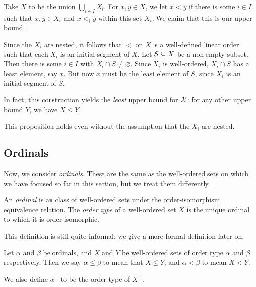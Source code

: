 \documentclass{article}
\begin{document}
\begin{prf}
    Take $X$ to be the union $\bigcup_{i \in I} X_i$. For $x, y \in X$, we let $x < y$ if there is some $i \in I$ such that $x, y \in X_i$ and $x <_i y$ within this set $X_i$. We claim that this is our upper bound.
    
    Since the $X_i$ are nested, it follows that $<$ on $X$ is a well-defined linear order such that each $X_i$ is an initial segment of $X$. Let $S \subseteq X$ be a non-empty subset. Then there is some $i \in I$ with $X_i \cap S \neq \varnothing$. Since $X_i$ is well-ordered, $X_i \cap S$ has a least element, say $x$. But now $x$ must be the least element of $S$, since $X_i$ is an initial segment of $S$.
\end{prf}

\begin{note}
	In fact, this construction yields the \textit{least} upper bound for $\mathcal{X}$: for any other upper bound $Y$, we have $X \leq Y$.
\end{note}

\begin{note}
	This proposition holds even without the assumption that the $X_i$ are nested. %
\end{note}


\subsection{Ordinals}

Now, we consider \textit{ordinals}. These are the same as the well-ordered sets on which we have focused so far in this section, but we treat them differently.

\begin{definition}[Ordinal]
    An \textit{ordinal} is an class of well-ordered sets under the order-isomorphism equivalence relation. The \textit{order type} of a well-ordered set $X$ is the unique ordinal to which it is order-isomorphic.
\end{definition}

\begin{note}
	This definition is still quite informal: we give a more formal definition later on. %
\end{note}

\begin{definition}
    Let $\alpha$ and $\beta$ be ordinals, and $X$ and $Y$ be well-ordered sets of order type $\alpha$ and $\beta$ respectively. Then we say $\alpha \leq \beta$ to mean that $X \leq Y$, and $\alpha < \beta$ to mean $X < Y$.
    
    We also define $\alpha^+$ to be the order type of $X^+$.
\end{definition}
\end{document}
